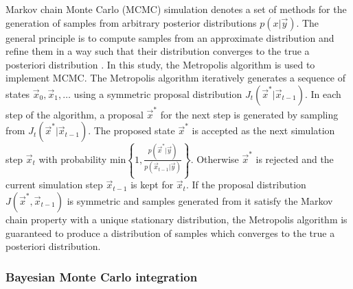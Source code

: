 \documentclass[journal abbreviation, manuscript]{copernicus}
\begin{document}
Markov chain Monte Carlo (MCMC) simulation denotes a set of methods for the
generation of samples from arbitrary posterior distributions $p(x | \vec{y})$.
The general principle is to compute samples from an approximate distribution and
refine them in a way such that their distribution converges to the true a
posteriori distribution \citep{bda}. In this study, the Metropolis algorithm is
used to implement MCMC. The Metropolis algorithm iteratively generates a
sequence of states $\vec{x}_0, \vec{x}_1, \ldots$ using a symmetric proposal
distribution $J_t(\vec{x}^* | \vec{x}_{t-1})$. In each step of the algorithm, a
proposal $\vec{x}^*$ for the next step is generated by sampling from
$J_t(\vec{x}^* | \vec{x}_{t-1})$. The proposed state $\vec{x}^*$ is accepted as
the next simulation step $\vec{x}_t$ with probability $\text{min} \left \{1,
\frac{p(\vec{x}^* | \vec{y})}{p(\vec{x}_{t-1} | \vec{y})} \right \}$. Otherwise
$\vec{x}^*$ is rejected and the current simulation step $\vec{x}_{t-1}$ is kept
for $\vec{x}_t$. If the proposal distribution $J(\vec{x}^*, \vec{x}_{t-1})$ is
symmetric and samples generated from it satisfy the Markov chain property with a
unique stationary distribution, the Metropolis algorithm is guaranteed to
produce a distribution of samples which converges to the true a posteriori
distribution.

\subsubsection{Bayesian Monte Carlo integration}
\end{document}
